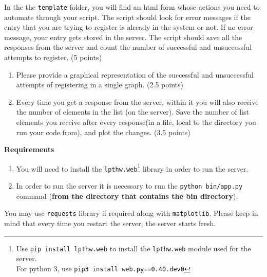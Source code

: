 \documentclass{WeSTassignment}
\begin{document}
In the the \texttt{template} folder, you will find an html form whose actions you need to automate through your script. The script should look for error messages if the entry that you are trying to register is already in the system or not. If no error message, your entry gets stored in the server. The script should save all the responses from the server and count the number of successful and unsuccessful attempts to register. (5 points)

\begin{enumerate}
\item Please provide a graphical representation of the successful and unsuccessful attempts of registering in a single graph. (2.5 points)
\item Every time you get a response from the server, within it you will also receive the number of elements in the list (on the server). Save the number of list elements you receive after every response(in a file, local to the directory you run your code from), and plot the changes. (3.5 points)
\end{enumerate}

\textbf{Requirements}
\begin{enumerate}
\item You will need to install the \texttt{lpthw.web}\footnote{Use \texttt{pip install lpthw.web} to install the \texttt{lpthw.web} module used for the server. \\For python 3, use \texttt{pip3 install web.py==0.40.dev0}} library in order to run the server.
\item In order to run the server it is necessary to run the \texttt{python bin/app.py} command (\textbf{from the directory that contains the bin directory}).

\end{enumerate}


You may use \texttt{requests} library if required along with \texttt{matplotlib}. 
Please keep in mind that every time you restart the server, the server starts fresh.  
\end{document}
